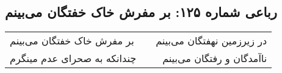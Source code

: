 \begin{center}
\section*{رباعی شماره ۱۲۵: بر مفرش خاک خفتگان می‌بینم}
\label{sec:sh125}
\begin{longtable}{l p{0.5cm} r}
بر مفرش خاک خفتگان می‌بینم
&&
در زیرزمین نهفتگان می‌بینم
\\
چندانکه به صحرای عدم مینگرم
&&
ناآمدگان و رفتگان می‌بینم
\\
\end{longtable}
\end{center}
